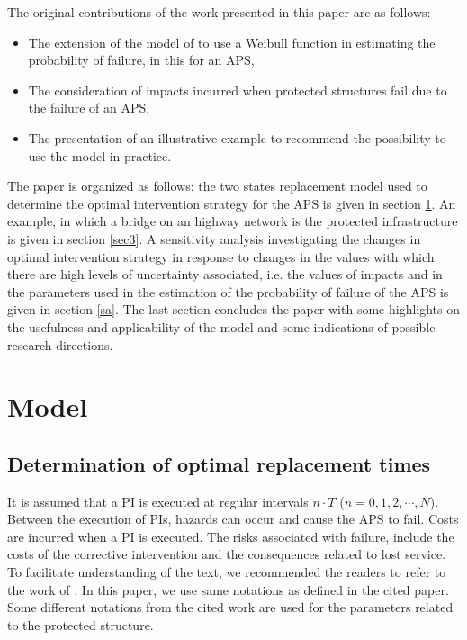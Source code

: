 \documentclass[]{article}
\begin{document}
The original contributions of the work presented in this paper are
as follows:
\begin{itemize}
\item The extension of the model of \citet{Kaio1984} to use a Weibull function
in estimating the probability of failure, in this for an APS, 
\item The consideration of impacts incurred when protected structures fail due to the failure of an APS,
\item The presentation of an illustrative example to recommend the possibility to use the model in practice.
\end{itemize}
The paper is organized as follows: the two states replacement model
used to determine the optimal intervention strategy for the APS is
given in section \ref{model}. An example, in which a bridge on an highway network
is the protected infrastructure is given in section \ref{sec3}. A
sensitivity analysis investigating the changes in optimal intervention
strategy in response to changes in the values with which there are
high levels of uncertainty associated, i.e. the values of impacts
and in the parameters used in the estimation of the probability of
failure of the APS is given in section \ref{sa}. The last section
concludes the paper with some highlights on the usefulness and applicability
of the model and some indications of possible research directions. 


\section{Model} \label{model}
\subsection{Determination of optimal replacement times}
\label{sec2} It is assumed that a PI is executed at regular intervals 
$n\cdot T$ ($n=0,1,2,\cdots,N$). Between the execution of PIs, hazards can occur and cause the APS to fail.
Costs are incurred when a PI is executed. The risks associated with
failure, include the costs of the corrective intervention and the
consequences related to lost service. To facilitate understanding
of the text, we recommended the readers to refer to the work of \citet{Kaio1984}. In this paper, we use same notations as defined in the cited paper. Some different notations from the cited work are used for the parameters related to the protected structure. 

\end{document}

